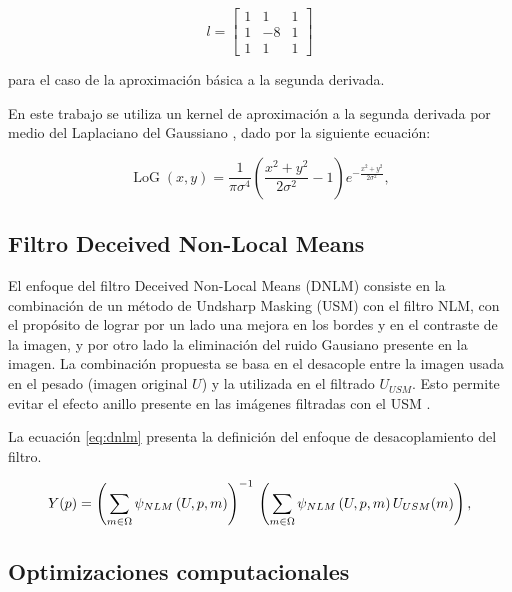\begin{equation} l = \left[
\begin{array}{ccc}
1 & 1 & 1\\
1 & -8 & 1\\
1 & 1 & 1
\end{array}\right]
\end{equation}

para el caso de la aproximaci\'on b\'asica a la segunda derivada.

En este trabajo se utiliza un kernel de aproximaci\'on a la segunda derivada por medio del Laplaciano del Gaussiano \cite{sotak1989laplacian}, dado por la siguiente ecuaci\'on:

\begin{equation}
\operatorname{LoG}(x,y) = \frac{1}{\pi\sigma^4}\left(\frac{x^2+y^2}{2\sigma^2} - 1\right)e^{-\frac{x^2+y^2}{2\sigma^2}},
\end{equation}



\subsection{Filtro Deceived Non-Local Means}
\label{ch:marco_dnlm}


El enfoque del filtro Deceived Non-Local Means (DNLM) consiste en la combinaci\'on de un m\'etodo de Undsharp Masking (USM) con el filtro NLM, con el prop\'osito de lograr por un lado una mejora en los bordes y en el contraste de la imagen, y por otro lado la eliminaci\'on del ruido Gausiano  presente en la imagen. La combinaci\'on propuesta se basa en el desacople entre la imagen usada en el pesado (imagen original $U$) y la utilizada en el filtrado $U_{USM}$. Esto permite evitar el efecto anillo presente en las im\'agenes filtradas con el USM \cite{calderon2015dewaff}.

 La ecuaci\'on \ref{eq:dnlm} presenta la definici\'on del enfoque de desacoplamiento del filtro.

\begin{equation}
\label{eq:dnlm}
Y(p)=\left(\sum_{m\in \Omega}\psi_{NLM}\left(U, p, m\right)\right)^{-1} \\ \left(\sum_{m\in \Omega}\psi_{NLM}\left(U, p, m\right)U_{USM}(m)\right),
\end{equation}




\subsection{Optimizaciones computacionales}
\label{ch:marco_opt}

